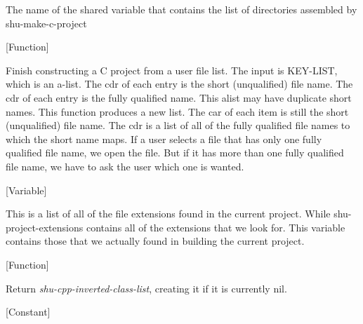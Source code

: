 \begin{doc-string}
The name of the shared variable that contains the list of directories assembled
by shu-make-c-project
\end{doc-string}

\vspace{1em}
\noindent
{}
\usebox{\funcname}
 \hfill [Function]

\begin{doc-string}
Finish constructing a C project from a user file list.  The input is
KEY-LIST, which is an a-list.  The cdr of each entry is the short (unqualified)
file name.  The cdr of each entry is the fully qualified name.  This alist may
have duplicate short names.  This function produces a new list.  The car of each
item is still the short (unqualified) file name.  The cdr is a list of all of
the fully qualified file names to which the short name maps.  If a user selects
a file that has only one fully qualified file name, we open the file.  But if it
has more than one fully qualified file name, we have to ask the user which one
is wanted.
\end{doc-string}

\vspace{1em}
\noindent
{}
\usebox{\funcname}
 \hfill [Variable]

\begin{doc-string}
This is a list of all of the file extensions found in the current project.  While
shu-project-extensions contains all of the extensions that we look for.  This variable
contains those that we actually found in building the current project.
\end{doc-string}

\vspace{1em}
\noindent
{}
\usebox{\funcname}
 \hfill [Function]

\begin{doc-string}
Return \emph{shu-cpp-inverted-class-list}, creating it if it is currently nil.
\end{doc-string}

\vspace{1em}
\noindent
{}
\usebox{\funcname}
 \hfill [Constant]

